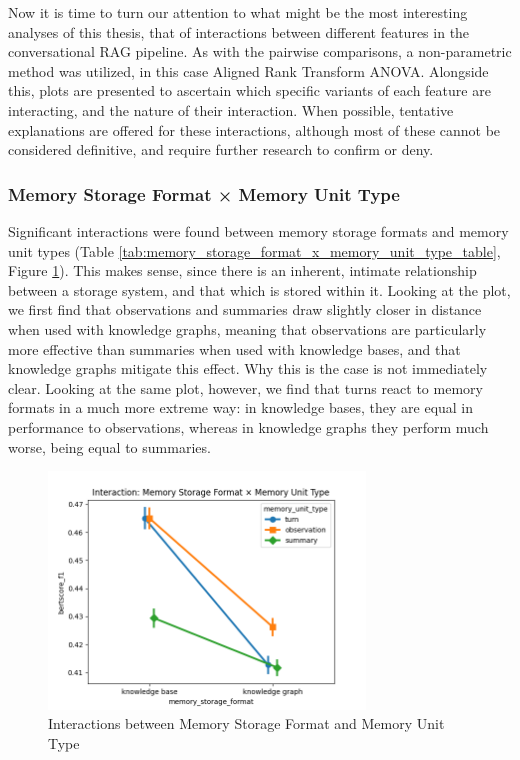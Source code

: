Now it is time to turn our attention to what might be the most interesting analyses of this thesis, that of interactions between different features in the conversational RAG pipeline. As with the pairwise comparisons, a non-parametric method was utilized, in this case Aligned Rank Transform ANOVA. Alongside this, plots are presented to ascertain which specific variants of each feature are interacting, and the nature of their interaction. When possible, tentative explanations are offered for these interactions, although most of these cannot be considered definitive, and require further research to confirm or deny.


\subsubsection{Memory Storage Format × Memory Unit Type}
\label{memory_storage_format_x_memory_unit_type}

Significant interactions were found between memory storage formats and memory unit types (Table \ref{tab:memory_storage_format_x_memory_unit_type_table}, Figure \ref{fig:interaction_memory_storage_format_x_memory_unit_type}). This makes sense, since there is an inherent, intimate relationship between a storage system, and that which is stored within it. Looking at the plot, we first find that observations and summaries draw slightly closer in distance when used with knowledge graphs, meaning that observations are particularly more effective than summaries when used with knowledge bases, and that knowledge graphs mitigate this effect. Why this is the case is not immediately clear. Looking at the same plot, however, we find that turns react to memory formats in a much more extreme way: in knowledge bases, they are equal in performance to observations, whereas in knowledge graphs they perform much worse, being equal to summaries. 


\begin{figure}[p]
\centering
\includegraphics[width=0.75\textwidth]{charts/interaction_memory_storage_format_x_memory_unit_type.png}
\caption{Interactions between Memory Storage Format and Memory Unit Type}
\label{fig:interaction_memory_storage_format_x_memory_unit_type}
\end{figure}


